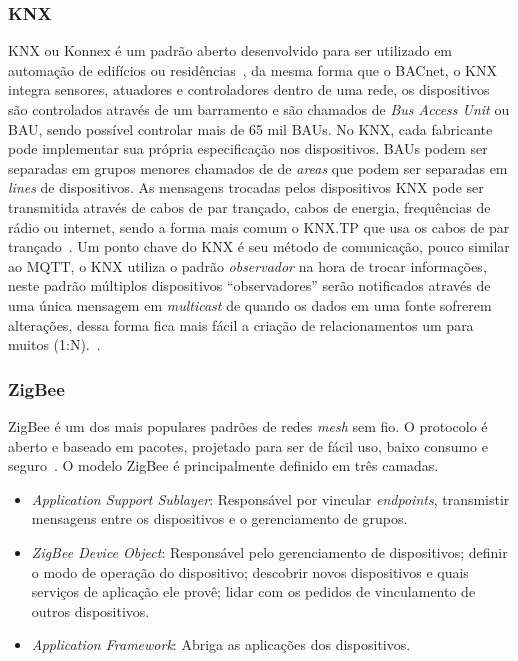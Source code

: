 \subsubsection{KNX}
KNX ou Konnex é um padrão aberto desenvolvido para ser utilizado em automação de edifícios ou residências~\cite{Sapundzhi2020},
da mesma forma que o BACnet, o KNX integra sensores, atuadores e controladores dentro de uma rede, os dispositivos são controlados
através de um barramento e são chamados de \emph{Bus Access Unit} ou BAU, sendo possível controlar mais de 65 mil BAUs.
No KNX, cada fabricante pode implementar sua própria especificação nos dispositivos. BAUs podem ser separadas em grupos menores
chamados de de \emph{areas} que podem ser separadas em \emph{lines} de dispositivos. As mensagens trocadas pelos dispositivos KNX
pode ser transmitida através de cabos de par trançado, cabos de energia, frequências de rádio ou internet, sendo a forma mais comum o
KNX.TP que usa os cabos de par trançado~\cite{Kraus2020}.
Um ponto chave do KNX é seu método de comunicação, pouco similar ao MQTT, o KNX utiliza o padrão \emph{observador} na hora de trocar informações,
neste padrão múltiplos dispositivos ``observadores'' serão notificados através de uma única mensagem em \emph{multicast}
de quando os dados em uma fonte sofrerem alterações, dessa forma fica mais fácil a criação de relacionamentos um para muitos (1:N).~\cite{Domingues2016}. 

\subsubsection{ZigBee}
ZigBee é um dos mais populares padrões de redes \emph{mesh} sem fio. O protocolo é aberto e baseado em pacotes, projetado para ser de fácil uso,
baixo consumo e seguro~\cite{tomar2011}.
O modelo ZigBee é principalmente definido em três camadas.
\begin{itemize}
    \item \emph{Application Support Sublayer}: Responsável por vincular \emph{endpoints}, transmistir mensagens entre os dispositivos e o gerenciamento de grupos.
    \item \emph{ZigBee Device Object}: Responsável pelo gerenciamento de dispositivos; definir o modo de operação do dispositivo; descobrir novos dispositivos e quais serviços de aplicação ele provê; lidar com os pedidos de vinculamento de outros dispositivos.
    \item \emph{Application Framework}: Abriga as aplicações dos dispositivos. 
\end{itemize}
~\cite{Domingues2016}

